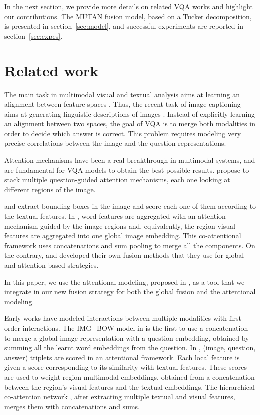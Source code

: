 \documentclass[10pt,twocolumn,letterpaper]{article}
\begin{document}
In the next section, we provide more details on related VQA works and highlight our contributions. The MUTAN fusion model, based on a Tucker decomposition, is presented in section~\ref{sec:model}, and 
successful experiments  are reported in section~\ref{sec:expes}.

 \section{Related work}
The main task in multimodal visual and textual analysis aims at learning an alignment between feature spaces \cite{Yan_2015_CVPR,TACL325,MaLSL15}. 
Thus, the recent task of image captioning aims at generating linguistic descriptions of images
\cite{VinyalsTBE16,icml2014c2_kiros14,icml2015_xuc15}. Instead of explicitly learning an alignment between two spaces, 
the goal of VQA \cite{VQA,Malinowski2014} is to merge both modalities in order to decide which answer is correct.
This problem requires modeling very precise correlations between the image and the question representations.



 Attention mechanisms \cite{icml2015_xuc15} have been a real breakthrough in multimodal systems, and are fundamental for VQA models to obtain the best possible results. \cite{YangHGDS16} propose to stack multiple question-guided attention mechanisms, each one looking at different regions of the image. 

 \cite{shih2016wtl} and \cite{NIPS2016_6261} extract bounding boxes in the image and score each one of them according to the textual features. 
In \cite{LuYBP16}, word features  are aggregated with an attention mechanism guided by the image regions and, equivalently, the region visual features are aggregated into one global image embedding. This co-attentional framework uses concatenations and sum pooling to merge all the components. On the contrary, \cite{fukui16mcb} and \cite{Kim2017} developed their own fusion methods that they use for global and attention-based strategies. 

In this paper, we use the attentional modeling, proposed in  \cite{fukui16mcb}, as a tool that we integrate in our new fusion strategy for both the global fusion and the attentional modeling.

Early works have modeled interactions between multiple modalities with first order interactions. The IMG+BOW model in \cite{DBLP:conf/nips/RenKZ15} is the first 
to use a concatenation to merge a global image representation with a question embedding, obtained by summing all the learnt word embeddings from the question. 
In \cite{shih2016wtl}, (image, question, answer) triplets are scored in an attentional framework. Each local feature is given a score corresponding to its similarity with textual features. 
These scores are used to weight region multimodal embeddings, obtained from a concatenation between the region's visual features and the textual embeddings. 
The hierarchical co-attention network \cite{LuYBP16}, after extracting multiple textual and visual features, merges them with concatenations and sums.
\end{document}

